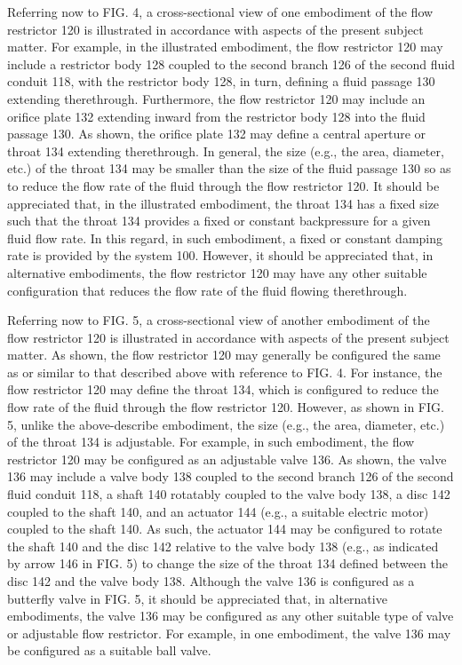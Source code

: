 \documentclass[11pt,a4paper]{article}
\begin{document}
Referring now to FIG. 4, a cross-sectional view of one embodiment of the flow restrictor 120 is illustrated in accordance with aspects of the present subject matter. For example, in the illustrated embodiment, the flow restrictor 120 may include a restrictor body 128 coupled to the second branch 126 of the second fluid conduit 118, with the restrictor body 128, in turn, defining a fluid passage 130 extending therethrough. Furthermore, the flow restrictor 120 may include an orifice plate 132 extending inward from the restrictor body 128 into the fluid passage 130. As shown, the orifice plate 132 may define a central aperture or throat 134 extending therethrough. In general, the size (e.g., the area, diameter, etc.) of the throat 134 may be smaller than the size of the fluid passage 130 so as to reduce the flow rate of the fluid through the flow restrictor 120. It should be appreciated that, in the illustrated embodiment, the throat 134 has a fixed size such that the throat 134 provides a fixed or constant backpressure for a given fluid flow rate. In this regard, in such embodiment, a fixed or constant damping rate is provided by the system 100. However, it should be appreciated that, in alternative embodiments, the flow restrictor 120 may have any other suitable configuration that reduces the flow rate of the fluid flowing therethrough.

Referring now to FIG. 5, a cross-sectional view of another embodiment of the flow restrictor 120 is illustrated in accordance with aspects of the present subject matter. As shown, the flow restrictor 120 may generally be configured the same as or similar to that described above with reference to FIG. 4. For instance, the flow restrictor 120 may define the throat 134, which is configured to reduce the flow rate of the fluid through the flow restrictor 120. However, as shown in FIG. 5, unlike the above-describe embodiment, the size (e.g., the area, diameter, etc.) of the throat 134 is adjustable. For example, in such embodiment, the flow restrictor 120 may be configured as an adjustable valve 136. As shown, the valve 136 may include a valve body 138 coupled to the second branch 126 of the second fluid conduit 118, a shaft 140 rotatably coupled to the valve body 138, a disc 142 coupled to the shaft 140, and an actuator 144 (e.g., a suitable electric motor) coupled to the shaft 140. As such, the actuator 144 may be configured to rotate the shaft 140 and the disc 142 relative to the valve body 138 (e.g., as indicated by arrow 146 in FIG. 5) to change the size of the throat 134 defined between the disc 142 and the valve body 138. Although the valve 136 is configured as a butterfly valve in FIG. 5, it should be appreciated that, in alternative embodiments, the valve 136 may be configured as any other suitable type of valve or adjustable flow restrictor. For example, in one embodiment, the valve 136 may be configured as a suitable ball valve.
\end{document}
